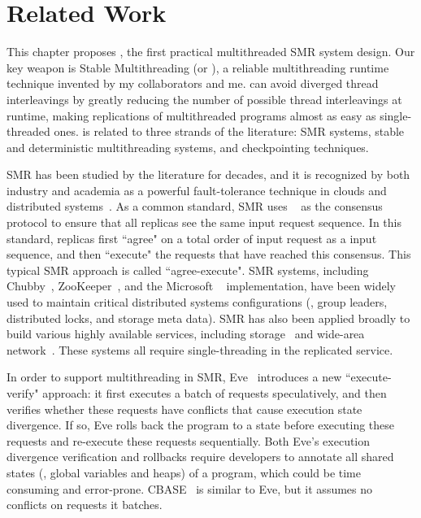 
\section{Related Work} \label{sec:crane-related}

This chapter proposes \crane, the first practical multithreaded SMR system
design. Our key weapon is Stable Multithreading (or \smt), a reliable
multithreading runtime technique invented by my collaborators and me. \smt can
avoid diverged thread interleavings by greatly reducing the number of possible
thread interleavings at runtime, making replications of multithreaded programs
almost as easy as single-threaded ones. \crane is related to three strands
of the literature:  SMR systems, stable and deterministic multithreading
systems, and checkpointing techniques.


  SMR has been studied by the literature
for decades, and it is recognized by both industry and academia as a powerful
fault-tolerance technique in clouds and distributed systems~\cite{lamportclock,
smr:tutorial}. As a common standard, SMR uses \paxos~\cite{paxos} as the
consensus protocol to ensure that all replicas see the same input request
sequence. In this standard, replicas first ``agree" on a total order of input
request as a input sequence, and then ``execute" the requests that have reached
this consensus. This typical SMR approach is called ``agree-execute". SMR
systems, including Chubby~\cite{chubby:osdi}, ZooKeeper~\cite{zookeeper}, and
the Microsoft \paxos~\cite{paxos} implementation, have been widely used to
maintain critical distributed systems configurations (\eg, group leaders,
distributed locks, and storage meta data). SMR has also been applied broadly to
build various highly available services, including
storage~\cite{paxos:datastore} and wide-area 
network~\cite{mencius:osdi08}. These systems all require single-threading in the
replicated service.

In order to support multithreading in SMR, Eve~\cite{eve:osdi12} introduces a
new ``execute-verify" approach: it first executes a batch of requests
speculatively, and then verifies whether these requests have conflicts that
cause execution state divergence. If so, Eve rolls back the program to a state
before executing these requests and re-execute these requests sequentially. Both
Eve's execution divergence verification and rollbacks require developers to
annotate all shared states (\eg, global variables and heaps) of a program, which
could be time consuming and error-prone. CBASE~\cite{cbase:dsn04} is similar to
Eve, but it assumes no conflicts on requests it batches.

